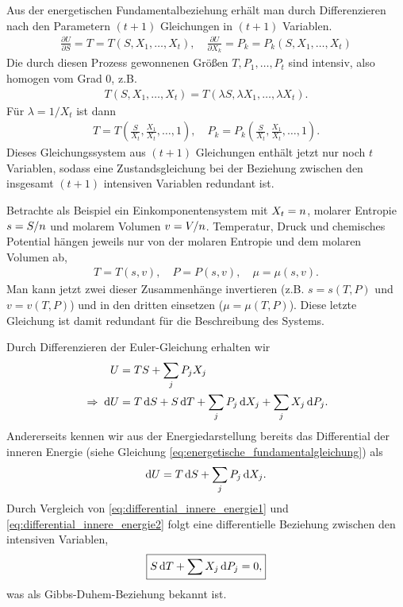 Aus der energetischen Fundamentalbeziehung erhält man durch Differenzieren nach den Parametern $(t+1)$ Gleichungen in $(t+1)$ Variablen.
\begin{align*}
    \frac{\partial U}{\partial S} = T = T(S,X_1,\ldots ,X_t), \quad
    \frac{\partial U}{\partial X_k} =P_k = P_k(S,X_1,\ldots ,X_t)
\end{align*}
Die durch diesen Prozess gewonnenen Größen $T,P_1,\ldots,P_t$ sind intensiv, also homogen vom Grad $0$, z.B.
\begin{align*}
    T(S,X_1,\ldots ,X_t)=T(\lambda S,\lambda X_1,\ldots ,\lambda X_t).
\end{align*}
Für $\lambda=1/X_t$ ist dann
\begin{align*}
    T = T\left(\frac{S}{X_t},\frac{X_1}{X_t},\ldots ,1\right), \quad P_k=P_k\left(\frac{S}{X_t},\frac{X_1}{X_t},\ldots ,1\right).
\end{align*}
Dieses Gleichungssystem aus $(t+1)$ Gleichungen enthält jetzt nur noch $t$ Variablen, sodass eine Zustandsgleichung bei der Beziehung zwischen den insgesamt $(t+1)$ intensiven Variablen redundant ist.

Betrachte als Beispiel ein Einkomponentensystem mit $X_t=n$, molarer Entropie $s=S/n$ und molarem Volumen $v=V/n$. Temperatur, Druck und chemisches Potential hängen jeweils nur von der molaren Entropie und dem molaren Volumen ab,
\begin{align*}
    T=T(s,v), \quad P=P(s,v), \quad \mu=\mu(s,v).
\end{align*}
Man kann jetzt zwei dieser Zusammenhänge invertieren (z.B. $s=s(T,P)$ und $v=v(T,P)$) und in den dritten einsetzen ($\mu=\mu(T,P)$). Diese letzte Gleichung ist damit redundant für die Beschreibung des Systems.

Durch Differenzieren der Euler-Gleichung erhalten wir
\begin{align}
    U                    & =TS+ \sum_j P_jX_j                                                 \nonumber \\
    \label{eq:differential_innere_energie1}
    \;\Rightarrow\; \mathop{}\!\mathrm{d} U & = T\mathop{}\!\mathrm{d} S + S\mathop{}\!\mathrm{d} T + \sum_j P_j\mathop{}\!\mathrm{d} X_j + \sum_j X_j\mathop{}\!\mathrm{d} P_j.
\end{align}
Andererseits kennen wir aus der Energiedarstellung bereits das Differential der inneren Energie (siehe Gleichung \eqref{eq:energetische_fundamentalgleichung}) als
\begin{align}
    \label{eq:differential_innere_energie2}
    \mathop{}\!\mathrm{d} U = T\mathop{}\!\mathrm{d} S + \sum_j P_j \mathop{}\!\mathrm{d} X_j.
\end{align}
Durch Vergleich von \eqref{eq:differential_innere_energie1} und \eqref{eq:differential_innere_energie2} folgt eine differentielle Beziehung zwischen den intensiven Variablen,
\begin{align}
    \label{eq:gibbs_duhem}
    \boxed{
        S\mathop{}\!\mathrm{d} T + \sum X_j \mathop{}\!\mathrm{d} P_j = 0,
    }
\end{align}
was als Gibbs-Duhem-Beziehung bekannt ist.

